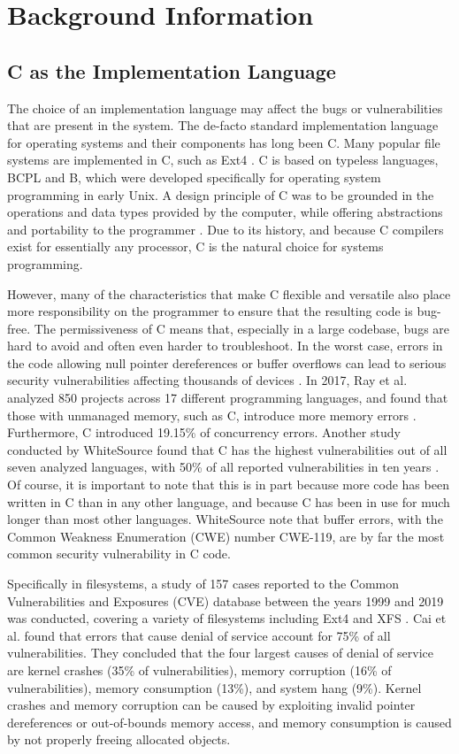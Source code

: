 \section{Background Information}
\subsection{C as the Implementation Language}
The choice of an implementation language may affect the bugs or vulnerabilities that are present in the system.
The de-facto standard implementation language for operating systems and their components has long been C.
Many popular file systems are implemented in C, such as Ext4 \cite{ext4code}.
C is based on typeless languages, BCPL and B, which were developed specifically for operating system programming in early Unix.
A design principle of C was to be grounded in the operations and data types provided by the computer, while offering abstractions and portability to the programmer \cite{ritchie1993}.
Due to its history, and because C compilers exist for essentially any processor, C is the natural choice for systems programming.

However, many of the characteristics that make C flexible and versatile also place more responsibility on the programmer to ensure that the resulting code is bug-free.
The permissiveness of C means that, especially in a large codebase, bugs are hard to avoid and often even harder to troubleshoot.
In the worst case, errors in the code allowing null pointer dereferences or buffer overflows can lead to serious security vulnerabilities affecting thousands of devices \cite{cert2001}.
In 2017, Ray et al. analyzed 850 projects across 17 different programming languages, and found that those with unmanaged memory, such as C, introduce more memory errors \cite{ray2017}.
Furthermore, C introduced 19.15\% of concurrency errors.
Another study conducted by WhiteSource found that C has the highest vulnerabilities out of all seven analyzed languages, with 50\% of all reported vulnerabilities in ten years \cite{whitesource2019}.
Of course, it is important to note that this is in part because more code has been written in C than in any other language, and because C has been in use for much longer than most other languages.
WhiteSource note that buffer errors, with the Common Weakness Enumeration (CWE) number CWE-119, are by far the most common security vulnerability in C code.

Specifically in filesystems, a study of 157 cases reported to the Common Vulnerabilities and Exposures (CVE) database between the years 1999 and 2019 was conducted, covering a variety of filesystems including Ext4 and XFS \cite{cai2019}.
Cai et al. found that errors that cause denial of service account for 75\% of all vulnerabilities.
They concluded that the four largest causes of denial of service are kernel crashes (35\% of vulnerabilities), memory corruption (16\% of vulnerabilities), memory consumption (13\%), and system hang (9\%).
Kernel crashes and memory corruption can be caused by exploiting invalid pointer dereferences or out-of-bounds memory access, and memory consumption is caused by not properly freeing allocated objects.

